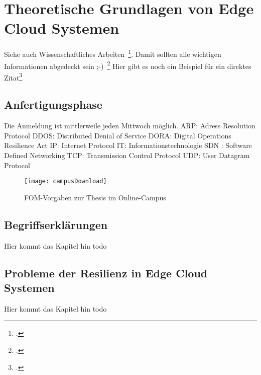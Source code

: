 \newpage
\section{Theoretische Grundlagen von Edge Cloud Systemen} \label{infos}
Siehe auch Wissenschaftliches Arbeiten~\footcite[\vglf][S. 1]{Balzert.2008}. %
Damit sollten alle wichtigen Informationen abgedeckt sein ;-)~\footcite[\vglf][]{Balzert.2008} %
Hier gibt es noch ein Beispiel für ein direktes Zitat\footcite[][]{Balzert.2008} %





\subsection{Anfertigungsphase}
Die Anmeldung ist mittlerweile jeden Mittwoch möglich. \ac{ARP}: Adress Resolution Protocol
\ac{DDOS}: Distributed Denial of Service
\ac{DORA}: Digital Operations Resilience Act
\ac{IP}: Internet Protocol
\ac{IT}: Informationstechnologie
\ac{SDN} : Software Defined Networking
\ac{TCP}: Transmission Control Protocol
\ac{UDP}: User Datagram Protocol

\begin{figure}[H]
\caption{FOM-Vorgaben zur Thesis im Online-Campus}
\texttt{[image: campusDownload]}
\\
\cite[Quelle: Vgl.][]{FOM}
\end{figure}





\subsection{Begriffserklärungen}

Hier kommt das Kapitel hin todo


\subsection{Probleme der Resilienz in Edge Cloud Systemen}

Hier kommt das Kapitel hin todo






